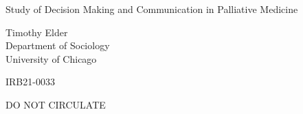 \documentclass[titlepage]{article}
\begin{document}
\begin{titlepage}
    \begin{center}
        \vspace*{5cm}
 
        \large{Study of Decision Making and Communication in Palliative Medicine}
 
        \vspace{2cm}
 
        Timothy Elder \\
        Department of Sociology \\
        University of Chicago \\
 
        \vfill
             
        IRB21-0033
             
        \vspace{0.8cm}
          
        DO NOT CIRCULATE
             
    \end{center}
 \end{titlepage}
\end{document}
